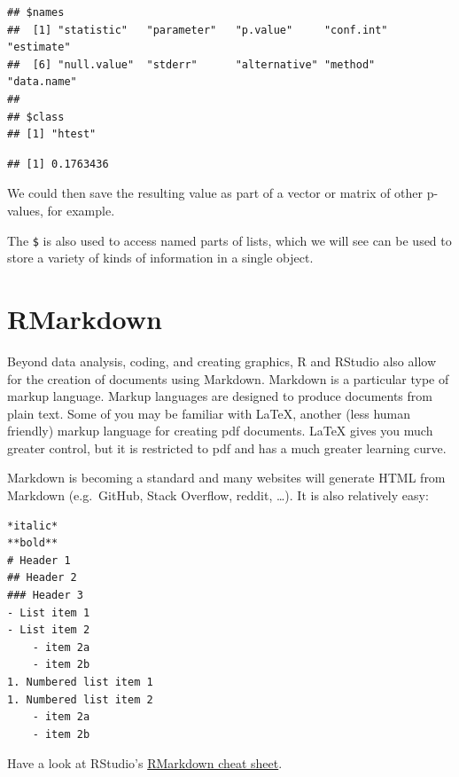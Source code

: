 \documentclass[
]{book}
\newenvironment{Shaded}{\begin{snugshade}}{\end{snugshade}}
\newcommand{\NormalTok}[1]{#1}
\newcommand{\SpecialCharTok}[1]{\textcolor[rgb]{0.00,0.00,0.00}{#1}}
\begin{document}
\begin{verbatim}
## $names
##  [1] "statistic"   "parameter"   "p.value"     "conf.int"    "estimate"   
##  [6] "null.value"  "stderr"      "alternative" "method"      "data.name"  
## 
## $class
## [1] "htest"
\end{verbatim}

\begin{Shaded}
\end{Shaded}

\begin{verbatim}
## [1] 0.1763436
\end{verbatim}

We could then save the resulting value as part of a vector or matrix of other p-values, for example.

The \texttt{\$} is also used to access named parts of lists, which we will see can be used to store a variety of kinds of information in a single object.

\hypertarget{rmarkdown}{%
\section{RMarkdown}\label{rmarkdown}}

Beyond data analysis, coding, and creating graphics, R and RStudio also allow for the creation of documents using Markdown. Markdown is a particular type of markup language. Markup languages are designed to produce documents from plain text. Some of you may be familiar with LaTeX, another (less human friendly) markup language for creating pdf documents. LaTeX gives you much greater control, but it is restricted to pdf and has a much greater learning curve.

Markdown is becoming a standard and many websites will generate HTML from Markdown (e.g.~GitHub, Stack Overflow, reddit, \ldots). It is also relatively easy:

\begin{verbatim}
*italic*
**bold**
# Header 1
## Header 2
### Header 3
- List item 1
- List item 2
    - item 2a
    - item 2b
1. Numbered list item 1
1. Numbered list item 2
    - item 2a
    - item 2b
\end{verbatim}

Have a look at RStudio's \href{https://www.rstudio.com/resources/cheatsheets/}{RMarkdown cheat sheet}.
\end{document}
